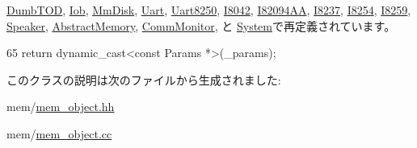 \hyperlink{classDumbTOD_acd3c3feb78ae7a8f88fe0f110a718dff}{DumbTOD}, \hyperlink{classIob_acd3c3feb78ae7a8f88fe0f110a718dff}{Iob}, \hyperlink{classMmDisk_acd3c3feb78ae7a8f88fe0f110a718dff}{MmDisk}, \hyperlink{classUart_acd3c3feb78ae7a8f88fe0f110a718dff}{Uart}, \hyperlink{classUart8250_acd3c3feb78ae7a8f88fe0f110a718dff}{Uart8250}, \hyperlink{classX86ISA_1_1I8042_acd3c3feb78ae7a8f88fe0f110a718dff}{I8042}, \hyperlink{classX86ISA_1_1I82094AA_acd3c3feb78ae7a8f88fe0f110a718dff}{I82094AA}, \hyperlink{classX86ISA_1_1I8237_acd3c3feb78ae7a8f88fe0f110a718dff}{I8237}, \hyperlink{classX86ISA_1_1I8254_acd3c3feb78ae7a8f88fe0f110a718dff}{I8254}, \hyperlink{classX86ISA_1_1I8259_acd3c3feb78ae7a8f88fe0f110a718dff}{I8259}, \hyperlink{classX86ISA_1_1Speaker_acd3c3feb78ae7a8f88fe0f110a718dff}{Speaker}, \hyperlink{classAbstractMemory_acd3c3feb78ae7a8f88fe0f110a718dff}{AbstractMemory}, \hyperlink{classCommMonitor_acd3c3feb78ae7a8f88fe0f110a718dff}{CommMonitor}, と \hyperlink{classSystem_acd3c3feb78ae7a8f88fe0f110a718dff}{System}で再定義されています。


\begin{DoxyCode}
65     { return dynamic_cast<const Params *>(_params); }
\end{DoxyCode}


このクラスの説明は次のファイルから生成されました:\begin{DoxyCompactItemize}
\item 
mem/\hyperlink{mem__object_8hh}{mem\_\-object.hh}\item 
mem/\hyperlink{mem__object_8cc}{mem\_\-object.cc}\end{DoxyCompactItemize}
